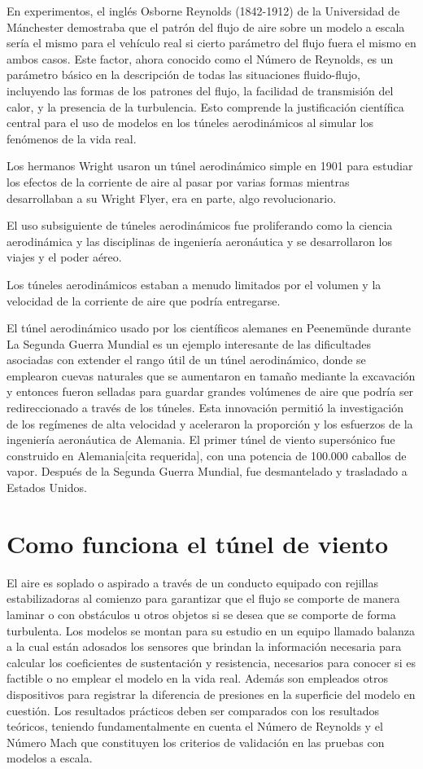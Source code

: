 \documentclass[10pt,a4paper]{article}
\begin{document}
En experimentos, el inglés Osborne Reynolds (1842-1912) de la Universidad de Mánchester demostraba que el patrón del flujo de aire sobre un modelo a escala sería el mismo para el vehículo real si cierto parámetro del flujo fuera el mismo en ambos casos. Este factor, ahora conocido como el Número de Reynolds, es un parámetro básico en la descripción de todas las situaciones fluido-flujo, incluyendo las formas de los patrones del flujo, la facilidad de transmisión del calor, y la presencia de la turbulencia. Esto comprende la justificación científica central para el uso de modelos en los túneles aerodinámicos al simular los fenómenos de la vida real.

Los hermanos Wright usaron un túnel aerodinámico simple en 1901 para estudiar los efectos de la corriente de aire al pasar por varias formas mientras desarrollaban a su Wright Flyer, era en parte, algo revolucionario.

El uso subsiguiente de túneles aerodinámicos fue proliferando como la ciencia aerodinámica y las disciplinas de ingeniería aeronáutica y se desarrollaron los viajes y el poder aéreo.

Los túneles aerodinámicos estaban a menudo limitados por el volumen y la velocidad de la corriente de aire que podría entregarse.

El túnel aerodinámico usado por los científicos alemanes en Peenemünde durante La Segunda Guerra Mundial es un ejemplo interesante de las dificultades asociadas con extender el rango útil de un túnel aerodinámico, donde se emplearon cuevas naturales que se aumentaron en tamaño mediante la excavación y entonces fueron selladas para guardar grandes volúmenes de aire que podría ser redireccionado a través de los túneles. Esta innovación permitió la investigación de los regímenes de alta velocidad y aceleraron la proporción y los esfuerzos de la ingeniería aeronáutica de Alemania. El primer túnel de viento supersónico fue construido en Alemania[cita requerida], con una potencia de 100.000 caballos de vapor. Después de la Segunda Guerra Mundial, fue desmantelado y trasladado a Estados Unidos.
\section{Como funciona el túnel de viento}
El aire es soplado o aspirado a través de un conducto equipado con rejillas estabilizadoras al comienzo para garantizar que el flujo se comporte de manera laminar o con obstáculos u otros objetos si se desea que se comporte de forma turbulenta. Los modelos se montan para su estudio en un equipo llamado balanza a la cual están adosados los sensores que brindan la información necesaria para calcular los coeficientes de sustentación y resistencia, necesarios para conocer si es factible o no emplear el modelo en la vida real. Además son empleados otros dispositivos para registrar la diferencia de presiones en la superficie del modelo en cuestión. Los resultados prácticos deben ser comparados con los resultados teóricos, teniendo fundamentalmente en cuenta el Número de Reynolds y el Número Mach que constituyen los criterios de validación en las pruebas con modelos a escala.
\end{document}
